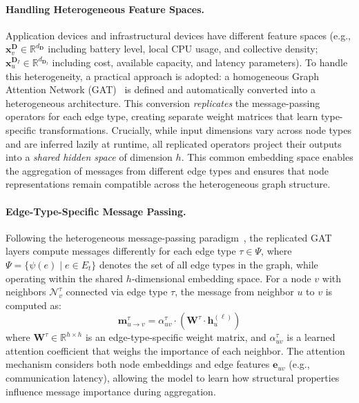 \paragraph{Handling Heterogeneous Feature Spaces.}
Application devices and infrastructural devices have different feature spaces 
 (e.g., $\mathbf{x}^{\mathbf{D}}_v \in \mathbb{R}^{d_{\mathbf{D}}}$ including battery level, local CPU usage, and collective density; 
 $\mathbf{x}^{\mathbf{D}_I}_u \in \mathbb{R}^{d_{\mathbf{D}_I}}$ including cost, available capacity, and latency parameters).
%
To handle this heterogeneity, 
 a practical approach is adopted: 
 a homogeneous Graph Attention Network (GAT)~\cite{DBLP:journals/corr/abs-1710-10903} 
 is defined and automatically converted into a heterogeneous architecture.
%
This conversion \emph{replicates} the message-passing operators for each edge type, 
 creating separate weight matrices that learn type-specific transformations.
%
Crucially, 
 while input dimensions vary across node types and are inferred lazily at runtime,
 all replicated operators project their outputs into a \emph{shared hidden space} of dimension $h$.
%
This common embedding space enables the aggregation of messages from different edge types
 and ensures that node representations remain compatible across the heterogeneous graph structure.


\paragraph{Edge-Type-Specific Message Passing.}
Following the heterogeneous message-passing paradigm~\cite{DBLP:conf/www/WangJSWYCY19}, 
 the replicated GAT layers compute messages differently for each edge type $\tau \in \Psi$,
 where $\Psi = \{\psi(e) \mid e \in E_t\}$ denotes the set of all edge types in the graph,
 while operating within the shared $h$-dimensional embedding space.
%
For a node $v$ with neighbors $\mathcal{N}^\tau_v$ connected via edge type $\tau$, 
 the message from neighbor $u$ to $v$ is computed as:
\begin{equation}\label{eq:message-ch10}
    \mathbf{m}^\tau_{u \to v} = \alpha^\tau_{uv} \cdot \left( \mathbf{W}^\tau \cdot \mathbf{h}^{(\ell)}_u \right)
\end{equation}
 where $\mathbf{W}^\tau \in \mathbb{R}^{h \times h}$ is an edge-type-specific weight matrix, 
 and $\alpha^\tau_{uv}$ is a learned attention coefficient that weighs the importance of each neighbor.
%
The attention mechanism considers both node embeddings and edge features $\mathbf{e}_{uv}$ (e.g., communication latency),
 allowing the model to learn how structural properties influence message importance during aggregation.

